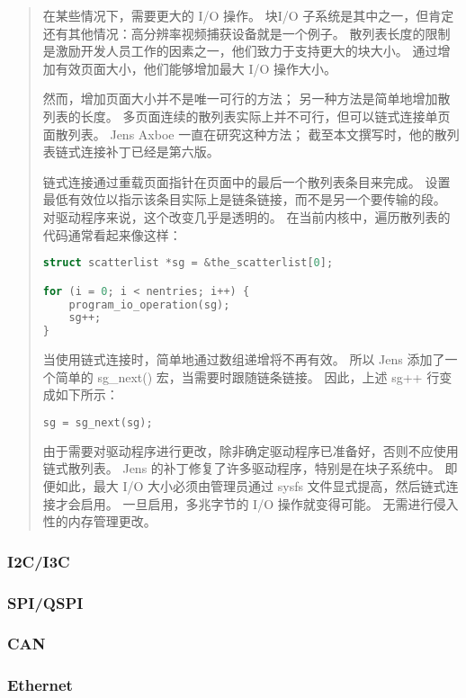 \begin{quote}
在某些情况下，需要更大的 I/O 操作。
块I/O 子系统是其中之一，但肯定还有其他情况：高分辨率视频捕获设备就是一个例子。
散列表长度的限制是激励开发人员工作的因素之一，他们致力于支持更大的块大小。
通过增加有效页面大小，他们能够增加最大 I/O 操作大小。

然而，增加页面大小并不是唯一可行的方法；
另一种方法是简单地增加散列表的长度。
多页面连续的散列表实际上并不可行，但可以链式连接单页面散列表。
Jens Axboe 一直在研究这种方法；
截至本文撰写时，他的散列表链式连接补丁已经是第六版。

链式连接通过重载页面指针在页面中的最后一个散列表条目来完成。
设置最低有效位以指示该条目实际上是链条链接，而不是另一个要传输的段。
对驱动程序来说，这个改变几乎是透明的。
在当前内核中，遍历散列表的代码通常看起来像这样：

\begin{lstlisting}[language=C]
struct scatterlist *sg = &the_scatterlist[0];

for (i = 0; i < nentries; i++) {
    program_io_operation(sg);
    sg++;
}
\end{lstlisting}

当使用链式连接时，简单地通过数组递增将不再有效。
所以 Jens 添加了一个简单的 sg\_next() 宏，当需要时跟随链条链接。
因此，上述 sg++ 行变成如下所示：

\begin{lstlisting}[language=C]
sg = sg_next(sg);
\end{lstlisting}

由于需要对驱动程序进行更改，除非确定驱动程序已准备好，否则不应使用链式散列表。
Jens 的补丁修复了许多驱动程序，特别是在块子系统中。
即便如此，最大 I/O 大小必须由管理员通过 sysfs 文件显式提高，然后链式连接才会启用。
一旦启用，多兆字节的 I/O 操作就变得可能。
无需进行侵入性的内存管理更改。
\end{quote}

\subsubsection{I2C/I3C}

\subsubsection{SPI/QSPI}

\subsubsection{CAN}

\subsubsection{Ethernet}

